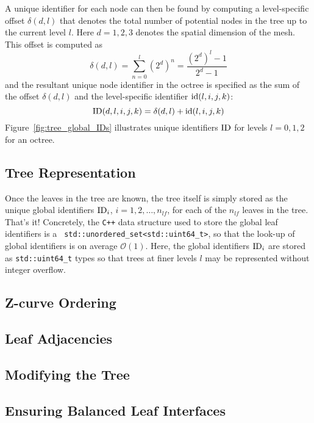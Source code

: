 

A unique identifier for each node can then be found by computing a
level-specific offset $\delta(d,l)$ that denotes the total number of potential
nodes in the tree up to the current level $l$. Here $d=1,2,3$ denotes the
spatial dimension of the mesh. This offset is computed as
%
\begin{equation}
\delta(d,l) = \sum_{n=0}^l (2^d)^n = \frac{(2^d)^l - 1}{2^d - 1}
\end{equation}
%
and the resultant unique node identifier in the octree is specified as the
sum of the offset $\delta(d,l)$ and the level-specific identifier
$\text{id}(l,i,j,k)$:
%
\begin{equation}
\text{ID}(d,l,i,j,k) = \delta(d,l) + \text{id}(l,i,j,k)
\end{equation}
%
Figure~\ref{fig:tree_global_IDs} illustrates unique identifiers $\text{ID}$ for
levels $l=0,1,2$ for an octree.

\subsection{Tree Representation}

Once the leaves in the tree are known, the tree itself is simply stored as
the unique global identifiers $\text{ID}_i$, $i=1,2,\dots,n_{lf}$, for each of
the $n_{lf}$ leaves in the tree. That's it! Concretely, the \texttt{C++} data
structure used to store the global leaf identifiers is a \texttt{
std::unordered\_set<std::uint64\_t>}, so that the look-up of global
identifiers is on average $\mathcal{O}(1)$. Here, the global identifiers
$\text{ID}_i$ are stored as \texttt{std::uint64\_t} types so that trees at finer
levels $l$ may be represented without integer overflow.

\subsection{Z-curve Ordering}

\subsection{Leaf Adjacencies}

\subsection{Modifying the Tree}

\subsection{Ensuring Balanced Leaf Interfaces}
